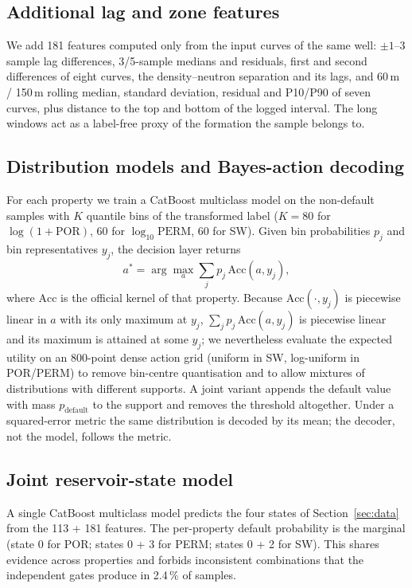 \documentclass[preprint,12pt]{elsarticle}
\begin{document}
\subsection{Additional lag and zone features}
\label{sec:features}

We add 181 features computed only from the input curves of the same well: $\pm1$--3 sample lag differences, 3/5-sample medians and residuals, first and second differences of eight curves, the density--neutron separation and its lags, and 60\,m / 150\,m rolling median, standard deviation, residual and P10/P90 of seven curves, plus distance to the top and bottom of the logged interval. The long windows act as a label-free proxy of the formation the sample belongs to.

\subsection{Distribution models and Bayes-action decoding}
\label{sec:decision}

For each property we train a CatBoost multiclass model on the non-default samples with $K$ quantile bins of the transformed label ($K=80$ for $\log(1+\mathrm{POR})$, 60 for $\log_{10}\mathrm{PERM}$, 60 for SW). Given bin probabilities $p_j$ and bin representatives $y_j$, the decision layer returns
\begin{equation}
a^{*}=\arg\max_{a}\sum_{j} p_j\,\mathrm{Acc}(a,y_j),
\label{eq:bayes}
\end{equation}
where $\mathrm{Acc}$ is the official kernel of that property. Because $\mathrm{Acc}(\cdot,y_j)$ is piecewise linear in $a$ with its only maximum at $y_j$, $\sum_j p_j\,\mathrm{Acc}(a,y_j)$ is piecewise linear and its maximum is attained at some $y_j$; we nevertheless evaluate the expected utility on an 800-point dense action grid (uniform in SW, log-uniform in POR/PERM) to remove bin-centre quantisation and to allow mixtures of distributions with different supports. A joint variant appends the default value with mass $p_{\mathrm{default}}$ to the support and removes the threshold altogether. Under a squared-error metric the same distribution is decoded by its mean; the decoder, not the model, follows the metric.

\subsection{Joint reservoir-state model}
\label{sec:states}

A single CatBoost multiclass model predicts the four states of Section~\ref{sec:data} from the 113 + 181 features. The per-property default probability is the marginal (state 0 for POR; states 0 + 3 for PERM; states 0 + 2 for SW). This shares evidence across properties and forbids inconsistent combinations that the independent gates produce in 2.4\,\% of samples.
\end{document}
